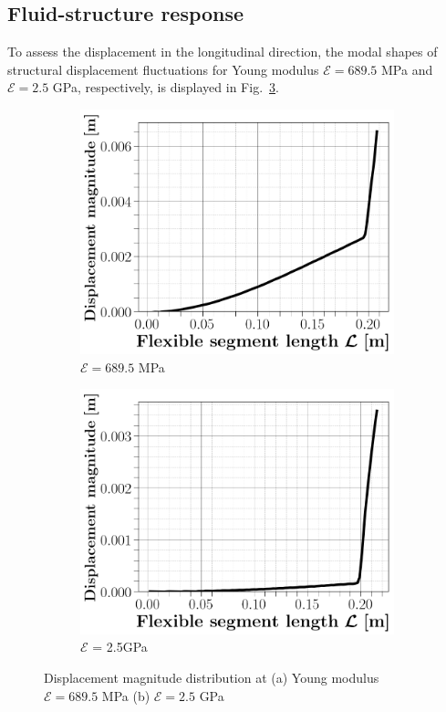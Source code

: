 \documentclass[conf]{new-aiaa}
\begin{document}
\subsection{Fluid-structure response}
\label{sec:fluidStrucutreRespnseToYoungAndRey}
To assess the displacement in the longitudinal direction, the modal shapes of structural displacement fluctuations for Young modulus $\mathcal{E}=689.5$ MPa  and $\mathcal{E}=2.5$ GPa, respectively, is displayed in Fig.~\ref{fig:dispMagni}.
%
\begin{figure}[ht!]
\centering
\begin{subfigure}{.45\textwidth}
\includegraphics[width=0.99\columnwidth]{figs/dispmagnitude689MPa.png}
\caption{$\mathcal{E}=689.5$ MPa}
\label{fig:dispMagni689.5MPa}
\end{subfigure}
\begin{subfigure}{.45\textwidth}
\includegraphics[width=0.99\columnwidth]{figs/dispmagnitude25GPa.png}
\caption{$\mathcal{E}$ = 2.5GPa}
\label{fig:deflection2.5GPa}
\end{subfigure}
\caption{Displacement magnitude distribution at (a) Young modulus $\mathcal{E}=689.5$ MPa (b) $\mathcal{E}= 2.5$ GPa}
\label{fig:dispMagni} 
\end{figure}
\end{document}
